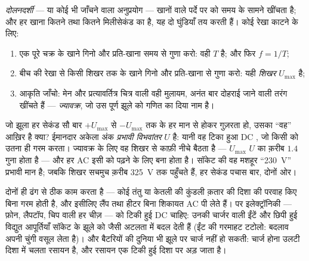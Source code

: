 \begin{method}[दोलनदर्शी की रेखा पढ़ना]\label{met:g9:alternating-current:scope}
\emph{दोलनदर्शी} --- या कोई भी जाँचने वाला अनुप्रयोग
--- खानों वाले पर्दे पर  को समय के सामने खींचता है; और हर खाना
कितने  तथा कितने मिलीसेकंड का है, यह दो घुंडियाँ तय करती हैं। कोई
रेखा काटने के लिए:
\begin{enumerate}
  \item एक पूरे चक्र के खाने गिनो और प्रति-खाना समय से गुणा करो: वही
        $T$ है; और फिर $f = 1/T$;
  \item बीच की रेखा से किसी शिखर तक के खाने गिनो और प्रति-खाना 
        से गुणा करो: यही \emph{शिखर } $U_{\max}$ है;
  \item आकृति जाँचो: मेन और प्रत्यावर्तित्र चित्र वाली वही मुलायम,
        अनंत बार दोहराई जाने वाली तरंग खींचते हैं ---
        \emph{ज्यावक्र}, जो उस पूर्ण झूले को गणित का दिया नाम है।
\end{enumerate}
\end{method}

\begin{proposition}[प्रभावी विभवांतर]\label{prop:g9:alternating-current:effective}
जो झूला हर सेकंड सौ बार $+U_{\max}$ से $-U_{\max}$ तक के
हर मान से होकर गुज़रता हो, उसका ``वह''  आख़िर है क्या? ईमानदार
अकेला अंक \emph{प्रभावी विभवांतर} $U$ है:
यानी वह टिका हुआ DC , जो किसी  को उतना ही गरम करता।
ज्यावक्र के लिए वह शिखर से काफ़ी नीचे बैठता है --- $U_{\max}$
$U$ का क़रीब $1.4$ गुना होता है --- और हर AC  इसी को पढ़ने के
लिए बना होता है। सॉकेट की वह मशहूर ``\qty{230}{V}'' प्रभावी मान है;
जबकि शिखर सचमुच क़रीब \qty{325}{V} तक पहुँचते हैं, हर सेकंड पचास बार,
दोनों ओर।
\end{proposition}

\begin{example}[किन उपकरणों को फ़र्क़ पड़ता है]\label{ex:g9:alternating-current:whocares}
 दोनों ही ढंग से ठीक काम करता है --- कोई तंतु या केतली की
कुंडली क़तार की दिशा की परवाह किए बिना गरम होती है, और इसीलिए लैंप तथा
हीटर बिना शिकायत AC पी लेते हैं। पर इलेक्ट्रॉनिकी --- फ़ोन, लैपटॉप,
चिप वाली हर चीज़ --- को टिकी हुई DC चाहिए: उनकी चार्जर वाली ईंटें और
छिपी हुई विद्युत आपूर्तियाँ सॉकेट के झूले को  जैसी अटलता में बदल
देती हैं (ईंट की गरमाहट टटोलो: बदलाव अपनी चुंगी वसूल लेता है)। और
बैटरियों की दुनिया भी झूले पर चार्ज नहीं हो सकती: चार्ज होना उलटी दिशा
में चलता रसायन है, और रसायन एक टिकी हुई दिशा पर अड़ जाता है।
\end{example}

